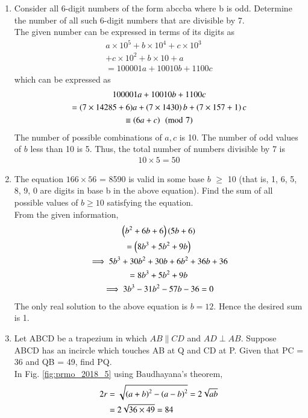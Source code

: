\documentclass[journal,12pt,twocolumn]{IEEEtran}
\begin{document}
\begin{enumerate}[label=\arabic*]
\item  Consider all 6-digit numbers of the form abccba where b is odd. Determine the number of all such 6-digit numbers that are divisible by 7. 
\\
\solution The given number can be expressed in terms of its digits as
\begin{multline}
a\times 10^5+b\times 10^4+c\times 10^3
\\
+c\times 10^2
+b\times 10+a
\\
=100001a+10010b+1100c
\end{multline}
%
which can be expressed as
\begin{multline}
100001a+10010b+1100c 
\\
= (7\times14285+6)a+\left(7\times1430\right)b+\left(7\times157+1\right)c
\\
\equiv \left(6a+c\right)\pmod{7}
\end{multline}
%
The number of possible combinations of $a,c$ is 10.  The number of odd values of $b$ less than 10 is 5.  Thus, the total number of numbers divisible by 7 is 
\begin{align}
10\times 5 = 50
\end{align}

\item The equation $166\times 56$ = 8590 is valid in some base $b$ 
$\ge$ 10 (that is, 1, 6, 5, 8, 9, 0 are digits in base b in the above equation). Find the sum of all possible values of $b \ge  10$ satisfying the equation. 
%
\\
\solution From the given information,
\begin{multline}
\left(b^2+6b+6\right)\left(5b+6\right) \\= \left(8b^3+5b^2+9b\right)
\\
\implies 5b^3+30b^2+30b+6b^2+36b+36 \\= 8b^3+5b^2+9b
\\
\implies 3b^3-31b^2-57b-36 =0
\end{multline}
%
The only real solution to the above equation is $b=12$.  Hence the desired sum is 1.
\item Let ABCD be a trapezium in which $AB \parallel CD$ and $AD \perp AB$. Suppose ABCD has an incircle which touches AB at Q and CD at P. Given that PC = 36 and QB = 49, find PQ. 
\\
\solution In Fig. \ref{fig:prmo_2018_5} using Baudhayana's theorem,
\begin{align}
2r &= \sqrt{\left(a+b\right)^2-\left(a-b\right)^2} = 2\sqrt{ab} 
\\
&= 2\sqrt{36\times 49}=84
\end{align}


\end{enumerate}
\end{document}
